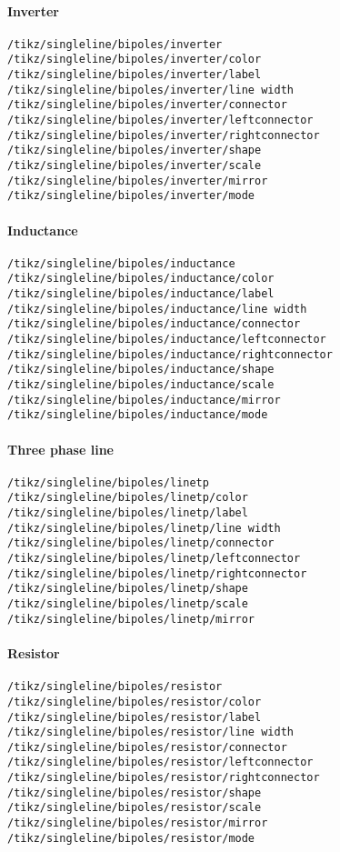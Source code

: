 \documentclass[a4]{article}
\begin{document}
\begin{footnotesize}
\paragraph{Inverter}
\begin{verbatim}
/tikz/singleline/bipoles/inverter
/tikz/singleline/bipoles/inverter/color
/tikz/singleline/bipoles/inverter/label
/tikz/singleline/bipoles/inverter/line width
/tikz/singleline/bipoles/inverter/connector
/tikz/singleline/bipoles/inverter/leftconnector
/tikz/singleline/bipoles/inverter/rightconnector
/tikz/singleline/bipoles/inverter/shape
/tikz/singleline/bipoles/inverter/scale
/tikz/singleline/bipoles/inverter/mirror
/tikz/singleline/bipoles/inverter/mode
\end{verbatim}
\paragraph{Inductance}
\begin{verbatim}
/tikz/singleline/bipoles/inductance
/tikz/singleline/bipoles/inductance/color
/tikz/singleline/bipoles/inductance/label
/tikz/singleline/bipoles/inductance/line width
/tikz/singleline/bipoles/inductance/connector
/tikz/singleline/bipoles/inductance/leftconnector
/tikz/singleline/bipoles/inductance/rightconnector
/tikz/singleline/bipoles/inductance/shape
/tikz/singleline/bipoles/inductance/scale
/tikz/singleline/bipoles/inductance/mirror
/tikz/singleline/bipoles/inductance/mode
\end{verbatim}
\paragraph{Three phase line}
\begin{verbatim}
/tikz/singleline/bipoles/linetp
/tikz/singleline/bipoles/linetp/color
/tikz/singleline/bipoles/linetp/label
/tikz/singleline/bipoles/linetp/line width
/tikz/singleline/bipoles/linetp/connector
/tikz/singleline/bipoles/linetp/leftconnector
/tikz/singleline/bipoles/linetp/rightconnector
/tikz/singleline/bipoles/linetp/shape
/tikz/singleline/bipoles/linetp/scale
/tikz/singleline/bipoles/linetp/mirror
\end{verbatim}
\paragraph{Resistor}
\begin{verbatim}
/tikz/singleline/bipoles/resistor
/tikz/singleline/bipoles/resistor/color
/tikz/singleline/bipoles/resistor/label
/tikz/singleline/bipoles/resistor/line width
/tikz/singleline/bipoles/resistor/connector
/tikz/singleline/bipoles/resistor/leftconnector
/tikz/singleline/bipoles/resistor/rightconnector
/tikz/singleline/bipoles/resistor/shape
/tikz/singleline/bipoles/resistor/scale
/tikz/singleline/bipoles/resistor/mirror
/tikz/singleline/bipoles/resistor/mode
\end{verbatim}

\end{footnotesize}
\end{document}
